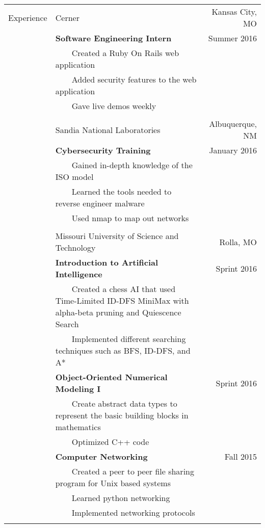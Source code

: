 \documentclass{article}
\newcommand{\tabitem}{~~\llap{\textbullet}~~}
\begin{document}
\begin{tabular}{p{1.5cm} p{12.9cm} r}
Experience  & Cerner 															& Kansas City, MO 		\\
			& \textbf{Software Engineering Intern} 								& Summer 2016			\\
			& \tabitem Created a Ruby On Rails web application 					& 						\\
			& \tabitem Added security features to the web application			& 						\\
			& \tabitem Gave live demos weekly 									& 						\\ \\

			& Sandia National Laboratories										& Albuquerque, NM 		\\
			& \textbf{Cybersecurity Training} 									& January 2016 			\\
			& \tabitem Gained in-depth knowledge of the ISO model 				& 						\\
			& \tabitem Learned the tools needed to reverse engineer malware 	& 						\\
			& \tabitem Used nmap to map out networks 							& 						\\ \\

			& Missouri University of Science and Technology						& Rolla, MO 			\\
			& \textbf{Introduction to Artificial Intelligence} 					& Sprint 2016 			\\
			& \tabitem Created a chess AI that used	 Time-Limited ID-DFS MiniMax with alpha-beta pruning and Quiescence Search	& \\
			& \tabitem Implemented different searching techniques such as BFS, ID-DFS, and A* 	& 		\\

			& \textbf{Object-Oriented Numerical Modeling I} 					& Sprint 2016 			\\
			& \tabitem Create abstract data types to represent the basic building blocks in mathematics & \\
			& \tabitem Optimized C++ code 										& 						\\

			& \textbf{Computer Networking} 										& Fall 2015 			\\
			& \tabitem Created a peer to peer file sharing program for Unix based systems 		& 		\\
			& \tabitem Learned python networking 								& 						\\
			& \tabitem Implemented networking protocols 						& 						\\ \\

\end{tabular}
\end{document}
